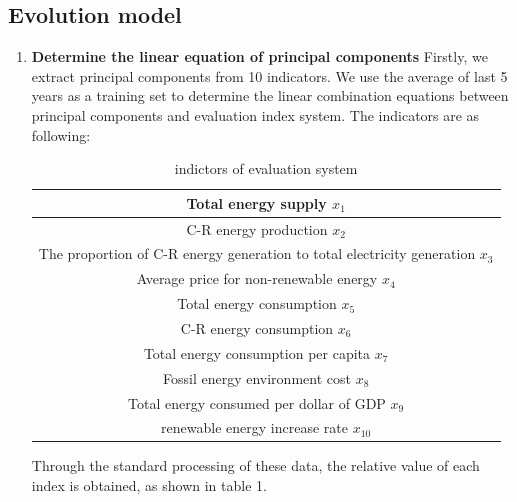 \documentclass{mcmthesis}
\begin{document}
        \subsection{Evolution model}
        \begin{enumerate}
          \item \textbf{Determine the linear equation of principal components}
        Firstly, we extract principal components from 10 indicators. We use the average of last 5 years as a training set to determine the linear combination equations between principal components and evaluation index system.
      The indicators are as following:
      \begin{table}
      \begin{tabular}{|c|}
      \hline
      {Total energy supply $x_1$}\\
      \hline
      {C-R energy production $x_2$}\\
      \hline
      {The proportion of C-R energy generation to total electricity generation $x_3$}\\
      \hline
      { Average price for non-renewable energy $x_4$}\\
      \hline
      { Total energy consumption $x_5$}\\
      \hline
      { C-R energy consumption $x_6$}\\
      \hline
      { Total energy consumption per capita $x_7$}\\
      \hline
      {  Fossil energy environment cost $x_8$}\\
      \hline
      { Total energy consumed per dollar of GDP $x_9$}\\
      \hline
      {renewable energy increase rate $x_{10}$}\\
      \hline
      \end{tabular}
      \caption{indictors of evaluation system}

      \end{table}



      Through the standard processing of these data, the relative value of each index is obtained, as shown in table 1.


\end{enumerate}
\end{document}
